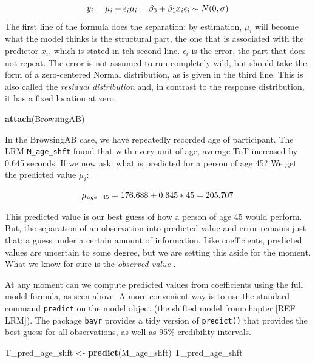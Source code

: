 \documentclass[]{svmono}
\newenvironment{Shaded}{\begin{snugshade}}{\end{snugshade}}
\newcommand{\KeywordTok}[1]{\textcolor[rgb]{0.13,0.29,0.53}{\textbf{#1}}}
\newcommand{\StringTok}[1]{\textcolor[rgb]{0.31,0.60,0.02}{#1}}
\newcommand{\NormalTok}[1]{#1}
\begin{document}
\[
y_i = \mu_i + \epsilon_i\\
\mu_i = \beta_0 + \beta_1 x_i\\
\epsilon_i \sim N(0, \sigma) 
\] The first line of the formula does the separation: by estimation,
\(\mu_i\) will become what the model thinks is the structural part, the
one that is associated with the predictor \(x_i\), which is stated in
teh second line. \(\epsilon_i\) is the error, the part that does not
repeat. The error is not assumed to run completely wild, but should take
the form of a zero-centered Normal distribution, as is given in the
third line. This is also called the \emph{residual distribution} and, in
contrast to the response distribution, it has a fixed location at zero.

\begin{Shaded}
\begin{Highlighting}[]
\KeywordTok{attach}\NormalTok{(BrowsingAB)}
\end{Highlighting}
\end{Shaded}

In the BrowsingAB case, we have repeatedly recorded age of participant.
The LRM \texttt{M\_age\_shft} found that with every unit of age, average
ToT increased by 0.645 seconds. If we now ask: what is predicted for a
person of age 45? We get the predicted value \(\mu_i\):

\[\mu_{age = 45} =176.688 + 0.645 * 45\\ 
= 205.707\]

This predicted value is our best guess of how a person of age 45 would
perform. But, the separation of an observation into predicted value and
error remains just that: a guess under a certain amount of information.
Like coefficients, predicted values are uncertain to some degree, but we
are setting this aside for the moment. What we know for sure is the
\emph{observed value} .

At any moment can we compute predicted values from coefficients using
the full model formula, as seen above. A more convenient way is to use
the standard command \texttt{predict} on the model object (the shifted
model from chapter {[}REF LRM{]}). The package \texttt{bayr} provides a
tidy version of \texttt{predict()} that provides the best guess for all
observations, as well as 95\% credibility intervals.

\begin{Shaded}
\begin{Highlighting}[]
\NormalTok{T_pred_age_shft <-}\StringTok{ }\KeywordTok{predict}\NormalTok{(M_age_shft)}
\NormalTok{T_pred_age_shft}
\end{Highlighting}
\end{Shaded}
\end{document}
